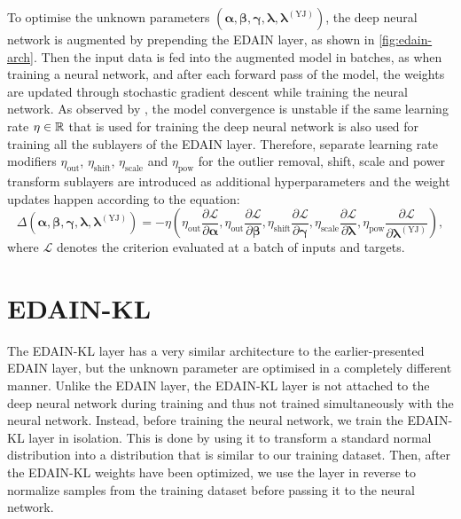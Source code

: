 \documentclass{statsmsc}
\begin{document}
{To optimise the unknown parameters
$\left( \bm{\alpha}, \bm{\beta}, \bm{\gamma}, \bm{\lambda}, \bm{\lambda}^{(\textrm{YJ})}\right)$,
the deep neural network is augmented by prepending the \ac{EDAIN} layer, as shown in
\cref{fig:edain-arch}. Then the input data is fed into the augmented model in batches,
as when training a neural network, and after each forward pass of the model, the weights
are updated through stochastic gradient descent while training the neural network.
As observed by \citeauthor{dain}, the model convergence is unstable if the same learning rate
$\eta \in \mathbb{R}$ that is used for training the deep neural network is also used for training all
the sublayers of the \ac{EDAIN} layer. Therefore, separate learning rate modifiers
$\eta_{\textrm{out}}$,
$\eta_{\textrm{shift}}$,
$\eta_{\textrm{scale}}$ and
$\eta_{\textrm{pow}}$ for the outlier removal, shift, scale and power transform sublayers are
introduced as additional hyperparameters and the weight updates happen according to the equation:
\begin{equation}
    \Delta \left( \bm{\alpha}, \bm{\beta}, \bm{\gamma}, \bm{\lambda}, \bm{\lambda}^{(\textrm{YJ})}\right)
    =
    -\eta\left(
        \eta_{\textrm{out}} \frac{\partial \mathcal{L}}{\partial \bm\alpha},
        \eta_{\textrm{out}} \frac{\partial \mathcal{L}}{\partial \bm\beta},
        \eta_{\textrm{shift}} \frac{\partial \mathcal{L}}{\partial \bm\gamma},
        \eta_{\textrm{scale}} \frac{\partial \mathcal{L}}{\partial \bm\lambda},
        \eta_{\textrm{pow}} \frac{\partial \mathcal{L}}{\partial \bm{\lambda}^{(\textrm{YJ})}}
    \right),
\end{equation}
where $\mathcal{L}$ denotes the criterion evaluated at a batch of inputs and targets.




\section{EDAIN-KL}%
\label{sec:EDAIN-KL-method}

The \ac{EDAIN-KL} layer has a very similar architecture to the earlier-presented
\ac{EDAIN} layer, but the unknown parameter are optimised in a completely different
manner. Unlike the \ac{EDAIN} layer, the \ac{EDAIN-KL} layer is not attached to the deep neural
network during training and thus not trained simultaneously with the neural network. Instead,
before training the neural network, we train the \ac{EDAIN-KL} layer in isolation.
This is done by using it to transform a standard
normal distribution into a distribution that is similar to our training dataset. Then, after
the \ac{EDAIN-KL} weights have been optimized, we use the layer in reverse to normalize samples
from the training dataset before passing it to the neural network.

}
\end{document}
